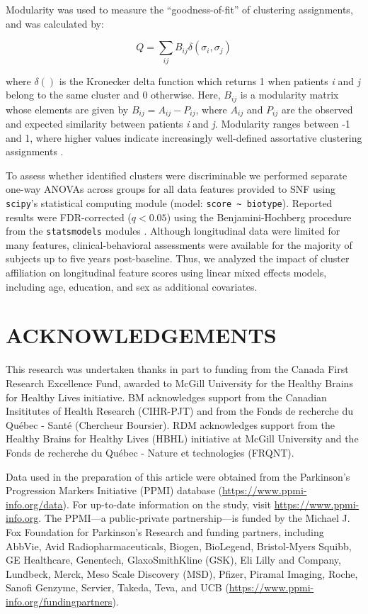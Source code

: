 \documentclass[12pt,aps,pra,reprint,showkeys]{revtex4-1}
\begin{document}
Modularity was used to measure the ``goodness-of-fit'' of clustering assignments, and was calculated by:

\begin{equation*}
    Q = \sum_{ij} B_{ij} \delta(\sigma_{i}, \sigma_{j})
\end{equation*}

\noindent where $\delta()$ is the Kronecker delta function which returns 1 when patients \emph{i} and \emph{j} belong to the same cluster and 0 otherwise.
Here, $B_{ij}$ is a modularity matrix whose elements are given by $B_{ij} = A_{ij} - P_{ij}$, where $A_{ij}$ and $P_{ij}$ are the observed and expected similarity between patients \emph{i} and \emph{j}.
Modularity ranges between -1 and 1, where higher values indicate increasingly well-defined assortative clustering assignments \citep{newman2006modularity}.

To assess whether identified clusters were discriminable we performed separate one-way ANOVAs across groups for all data features provided to SNF using \texttt{scipy}'s statistical computing module \citep{scipy} (model: \texttt{score \textasciitilde{} biotype}).
Reported results were FDR-corrected ($q < 0.05$) using the Benjamini-Hochberg procedure \citep{benjamini1995controlling} from the \texttt{statsmodels} modules \citep{statsmodels}.
Although longitudinal data were limited for many features, clinical-behavioral assessments were available for the majority of subjects up to five years post-baseline.
Thus, we analyzed the impact of cluster affiliation on longitudinal feature scores using linear mixed effects models, including age, education, and sex as additional covariates.

\section*{ACKNOWLEDGEMENTS}

This research was undertaken thanks in part to funding from the Canada First Research Excellence Fund, awarded to McGill University for the Healthy Brains for Healthy Lives initiative.
BM acknowledges support from the Canadian Insititutes of Health Research (CIHR-PJT) and from the Fonds de recherche du Qu\'{e}bec - Sant\'{e} (Chercheur Boursier).
RDM acknowledges support from the Healthy Brains for Healthy Lives (HBHL) initiative at McGill University and the Fonds de recherche du Qu\'{e}bec - Nature et technologies (FRQNT).

Data used in the preparation of this article were obtained from the Parkinson’s Progression Markers Initiative (PPMI) database (\url{https://www.ppmi-info.org/data}).
For up-to-date information on the study, visit \url{https://www.ppmi-info.org}.
The PPMI---a public-private partnership---is funded by the Michael J. Fox Foundation for Parkinson’s Research and funding partners, including AbbVie, Avid Radiopharmaceuticals, Biogen, BioLegend, Bristol-Myers Squibb, GE Healthcare, Genentech, GlaxoSmithKline (GSK), Eli Lilly and Company, Lundbeck, Merck, Meso Scale Discovery (MSD), Pfizer, Piramal Imaging, Roche, Sanofi Genzyme, Servier, Takeda, Teva, and UCB (\url{https://www.ppmi-info.org/fundingpartners}).
\end{document}
